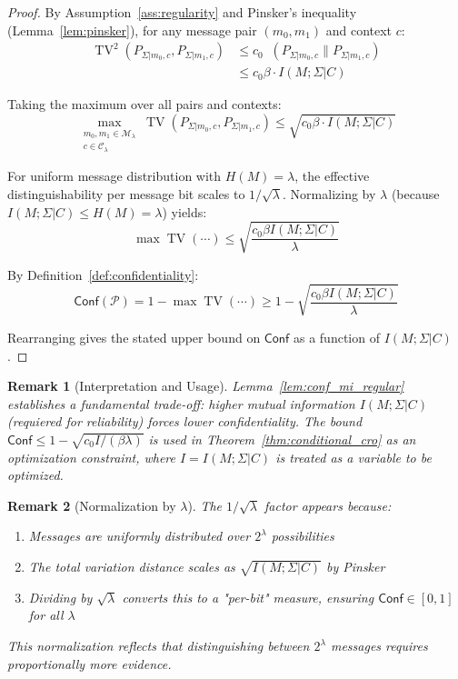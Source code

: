 \documentclass{ieeeaccess}
\newcommand{\Conf}{\mathsf{Conf}}
\DeclareMathOperator{\TV}{TV}
\DeclareMathOperator{\KL}{D_{\text{KL}}}
\newtheorem{remark}{Remark}[subsection]
\begin{document}
\begin{proof}
By Assumption~\ref{ass:regularity} and Pinsker's inequality (Lemma~\ref{lem:pinsker}), for any message pair $(m_0, m_1)$ and context $c$:
\begin{align}
\TV^2(P_{\Sigma|m_0,c}, P_{\Sigma|m_1,c}) 
    &\leq c_0 \KL(P_{\Sigma|m_0,c} \| P_{\Sigma|m_1,c}) \\
    &\leq c_0 \beta \cdot I(M;\Sigma|C)
\end{align}

Taking the maximum over all pairs and contexts:
\begin{equation}
\max_{\substack{m_0, m_1 \in \mathcal{M}_\lambda \\ c \in \mathcal{C}_\lambda}} \TV(P_{\Sigma|m_0,c}, P_{\Sigma|m_1,c}) 
    \leq \sqrt{c_0\beta \cdot I(M;\Sigma|C)}
\end{equation}

For uniform message distribution with $H(M) = \lambda$, the effective distinguishability per message bit scales to $1/\sqrt{\lambda}$. Normalizing by $\lambda$ (because $I(M;\Sigma|C) \leq H(M) = \lambda$) yields:
\begin{equation}
\max \TV(\cdots) \leq \sqrt{\frac{c_0\beta I(M;\Sigma|C)}{\lambda}}
\end{equation}

By Definition~\ref{def:confidentiality}:
\begin{equation}
\Conf(\mathcal{P}) = 1 - \max \TV(\cdots) \geq 1 - \sqrt{\frac{c_0\beta I(M;\Sigma|C)}{\lambda}}
\end{equation}

Rearranging gives the stated upper bound on $\Conf$ as a function of $I(M;\Sigma|C)$.
\end{proof}

\begin{remark}[Interpretation and Usage]
Lemma~\ref{lem:conf_mi_regular} establishes a fundamental trade-off: higher mutual information $I(M;\Sigma|C)$ (requiered for reliability) forces lower confidentiality. The bound $\Conf \leq 1 - \sqrt{c_0 I/(\beta\lambda)}$ is used in Theorem~\ref{thm:conditional_cro} as an optimization constraint, where $I = I(M;\Sigma|C)$ is treated as a variable to be optimized.
\end{remark}

\begin{remark}[Normalization by $\lambda$]
The $1/\sqrt{\lambda}$ factor appears because:
\begin{enumerate}
    \item Messages are uniformly distributed over $2^\lambda$ possibilities
    \item The total variation distance scales as $\sqrt{I(M;\Sigma|C)}$ by Pinsker
    \item Dividing by $\sqrt{\lambda}$ converts this to a "per-bit" measure, ensuring $\Conf \in [0,1]$ for all $\lambda$
\end{enumerate}
This normalization reflects that distinguishing between $2^\lambda$ messages requires proportionally more evidence.
\end{remark}
\end{document}
